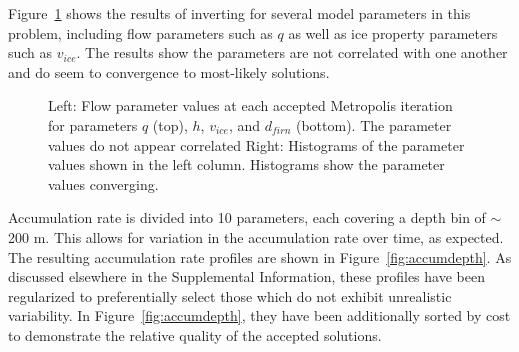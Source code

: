 Figure~\ref{fig:flowparamconvergence} shows the results of inverting for several model parameters in this problem, including flow parameters such as $q$ as well as ice property parameters such as $v_{ice}$. The results show the parameters are not correlated with one another and do seem to convergence to most-likely solutions.

\begin{figure}[ht]
\centering
{}
\caption[]{Left: Flow parameter values at each accepted Metropolis iteration for parameters $q$ (top), $h$, $v_{ice}$, and $d_{firn}$ (bottom). The parameter values do not appear correlated Right: Histograms of the parameter values shown in the left column. Histograms show the parameter values converging.}
\label{fig:flowparamconvergence}
\end{figure}

Accumulation rate is divided into 10 parameters, each covering a depth bin of $\sim$200 m. This allows for variation in the accumulation rate over time, as expected. The resulting accumulation rate profiles are shown in Figure~\ref{fig:accumdepth}. As discussed elsewhere in the Supplemental Information, these profiles have been regularized to preferentially select those which do not exhibit unrealistic variability. In Figure~\ref{fig:accumdepth}, they have been additionally sorted by cost to demonstrate the relative quality of the accepted solutions.

